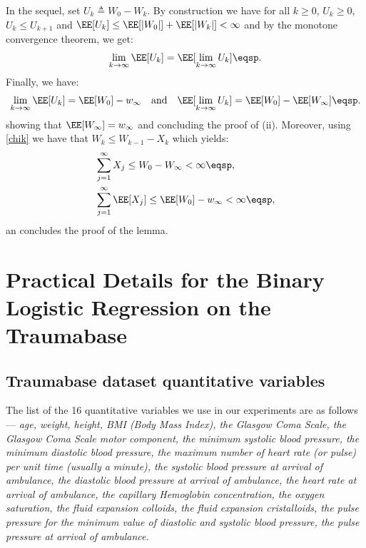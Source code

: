 \documentclass[11pt]{article}
\makeatletter
\renewenvironment{proof}[1][\proofname]{%
   \par\pushQED{\qed}\normalfont%
   \topsep6\p@\@plus6\p@\relax
   \trivlist\item[\hskip\labelsep\bfseries#1]%
   \ignorespaces
}{%
   \popQED\endtrivlist\@endpefalse
}
\theoremstyle{t}
\makeatother
\begin{document}
\begin{proof}
In the sequel, set $U_k \triangleq W_0 - W_k$. By construction we have for all $k \geq 0$, $U_k \geq 0$, $U_k \leq U_{k+1}$ and $\EE[U_k] \leq \EE[|W_0|] + \EE[|W_k|] < \infty$ and by the monotone convergence theorem, we get:
\begin{equation}
    \lim \limits_{k \to \infty} \EE[U_k] = \EE[\lim \limits_{k \to \infty}U_k]\eqsp.
\end{equation}
Finally, we have:
\begin{equation}
\lim \limits_{k \to \infty} \EE[U_k] = \EE[W_0] - w_{\infty} \quad \textrm{and} \quad \EE[\lim \limits_{k \to \infty}U_k] = \EE[W_0] - \EE[W_{\infty}] \eqsp.
\end{equation}
showing that $\EE[W_{\infty}] = w_{\infty}$ and concluding the proof of (ii). Moreover, using \eqref{chik} we have that $W_k \leq W_{k-1} - X_k$ which yields:
\begin{equation}
\begin{split}
    & \sum_{j=1}^{\infty}{X_j} \leq W_{0} - W_{\infty} < \infty \eqsp,\\
    & \sum_{j=1}^{\infty}{\EE[X_j]} \leq \EE[W_{0}] - w_{\infty} < \infty\eqsp,
\end{split}
\end{equation}
an concludes the proof of the lemma.
\end{proof}

\clearpage

 \section{Practical Details for the Binary Logistic Regression on the Traumabase}
 
 \subsection{Traumabase dataset quantitative variables}\label{appendix:variables}
  The list of the 16 quantitative variables we use in our experiments are as follows --- \textit{age, weight, height, BMI (Body Mass Index), the Glasgow Coma Scale, the Glasgow Coma Scale motor component, the minimum systolic blood pressure, the minimum diastolic blood pressure, the maximum number of heart rate (or pulse) per unit time (usually a minute), the systolic blood pressure at arrival of ambulance, the diastolic blood pressure at arrival of ambulance, the heart rate at arrival of ambulance, the capillary Hemoglobin concentration, the oxygen saturation, the fluid expansion colloids, the fluid expansion cristalloids, the pulse pressure for the minimum value of diastolic and systolic blood pressure, the pulse pressure at arrival of ambulance.}
\end{document}
